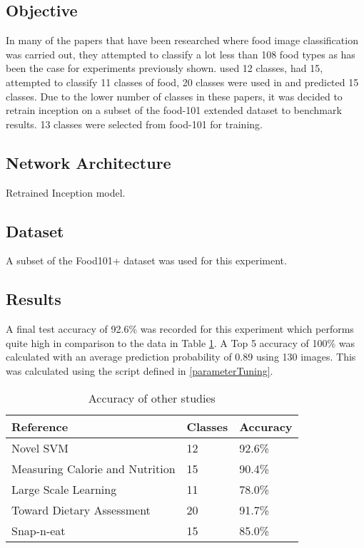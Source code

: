 \subsection*{Objective}
In many of the papers that have been researched where food image classification was carried out, they attempted to classify a lot less than 108 food types as has been the case for experiments previously shown.
\parencite{novelSVM} used 12 classes, \parencite{pouladzadeh2014measuring} had 15, \parencite{LSL_2015} attempted to classify 11 classes of food, 20 classes were used in \parencite{chen2010toward} and \parencite{snap} predicted 15 classes.
Due to the lower number of classes in these papers, it was decided to retrain inception on a subset of the food-101 extended dataset to benchmark results.
13 classes were selected from food-101 for training.

\subsection*{Network Architecture}
Retrained Inception model.

\subsection*{Dataset}
A subset of the Food101+ dataset was used for this experiment.

\subsection*{Results}
A final test accuracy of 92.6\% was recorded for this experiment which performs quite high in comparison to the data in Table \ref{classes_accuracy}.
A Top 5 accuracy of 100\% was calculated with an average prediction probability of 0.89 using 130 images.
This was calculated using the script defined in \ref{parameterTuning}.

\begin{table}[]
\centering
\caption{Accuracy of other studies}
\label{classes_accuracy}
\begin{tabular}{|l|l|l|}
\hline
\textbf{Reference}                       & \textbf{Classes} & \textbf{Accuracy}      \\ \hline
Novel SVM                       & 12      & 92.6\%        \\ \hline
Measuring Calorie and Nutrition & 15      & 90.4\%       \\ \hline
Large Scale Learning            & 11      & 78.0\%          \\ \hline
Toward Dietary Assessment       & 20      & 91.7\% \\ \hline
Snap-n-eat                      & 15      & 85.0\%         \\ \hline
\end{tabular}
\end{table}

